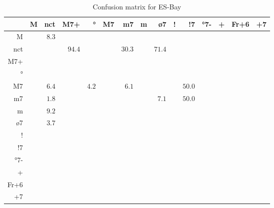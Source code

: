 \documentclass{article}
\begin{document}
\begin{table}
\begin{center}
\begin{tabular}{r|r|r|r|r|r|r|r|r|r|r|r|r|r|r}
       & M & nct & M7+ & ° & M7 & m7 & m & ø7 & ! & !7 & °7- & + & Fr+6 & +7 \\ \hline
 M & $ $ & $8.3$ & $ $ & $ $ & $ $ & $ $ & $ $ & $ $ & $ $ & $ $ & $ $ & $ $ & $ $ & $ $  \\ \hline
 nct & $ $ & $ $ & $94.4$ & $ $ & $ $ & $30.3$ & $ $ & $71.4$ & $ $ & $ $ & $ $ & $ $ & $ $ & $ $  \\ \hline
 M7+ & $ $ & $ $ & $ $ & $ $ & $ $ & $ $ & $ $ & $ $ & $ $ & $ $ & $ $ & $ $ & $ $ & $ $  \\ \hline
 ° & $ $ & $ $ & $ $ & $ $ & $ $ & $ $ & $ $ & $ $ & $ $ & $ $ & $ $ & $ $ & $ $ & $ $  \\ \hline
 M7 & $ $ & $6.4$ & $ $ & $4.2$ & $ $ & $6.1$ & $ $ & $ $ & $ $ & $50.0$ & $ $ & $ $ & $ $ & $ $  \\ \hline
 m7 & $ $ & $1.8$ & $ $ & $ $ & $ $ & $ $ & $ $ & $7.1$ & $ $ & $50.0$ & $ $ & $ $ & $ $ & $ $  \\ \hline
 m & $ $ & $9.2$ & $ $ & $ $ & $ $ & $ $ & $ $ & $ $ & $ $ & $ $ & $ $ & $ $ & $ $ & $ $  \\ \hline
 ø7 & $ $ & $3.7$ & $ $ & $ $ & $ $ & $ $ & $ $ & $ $ & $ $ & $ $ & $ $ & $ $ & $ $ & $ $  \\ \hline
 ! & $ $ & $ $ & $ $ & $ $ & $ $ & $ $ & $ $ & $ $ & $ $ & $ $ & $ $ & $ $ & $ $ & $ $  \\ \hline
 !7 & $ $ & $ $ & $ $ & $ $ & $ $ & $ $ & $ $ & $ $ & $ $ & $ $ & $ $ & $ $ & $ $ & $ $  \\ \hline
 °7- & $ $ & $ $ & $ $ & $ $ & $ $ & $ $ & $ $ & $ $ & $ $ & $ $ & $ $ & $ $ & $ $ & $ $  \\ \hline
 + & $ $ & $ $ & $ $ & $ $ & $ $ & $ $ & $ $ & $ $ & $ $ & $ $ & $ $ & $ $ & $ $ & $ $  \\ \hline
 Fr+6 & $ $ & $ $ & $ $ & $ $ & $ $ & $ $ & $ $ & $ $ & $ $ & $ $ & $ $ & $ $ & $ $ & $ $  \\ \hline
 +7 & $ $ & $ $ & $ $ & $ $ & $ $ & $ $ & $ $ & $ $ & $ $ & $ $ & $ $ & $ $ & $ $ & $ $  \\ \hline
\end{tabular}
\caption{Confusion matrix for ES-Bay}
\end{center}
\end{table}
\end{document}

